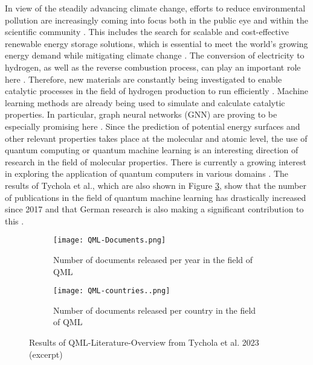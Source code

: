 In view of the steadily advancing climate change, efforts to reduce environmental pollution are
increasingly coming into focus both in the public eye and within the scientific community \cite{amin_hydrogen_2022}.
This includes the search for scalable and cost-effective renewable energy storage solutions, which
is essential to meet the world's growing energy demand while mitigating climate change \cite{kilkis_research_2019}. The
conversion of electricity to hydrogen, as well as the reverse combustion process, can play an
important role here \cite{amin_hydrogen_2022}. Therefore, new materials are constantly being investigated to enable
catalytic processes in the field of hydrogen production to run efficiently \cite{chen_waste-derived_2023}. Machine learning
methods are already being used to simulate and calculate catalytic properties. In particular, graph
neural networks (GNN) are proving to be especially promising here \cite{tran_open_2023, bronstein2017geometric}. Since the prediction of potential energy surfaces and other relevant properties takes place at the molecular and atomic level, the use of quantum computing or quantum machine learning is an interesting direction of research in the field of molecular properties. There is currently a growing interest in exploring the application of quantum computers in various domains \cite{valdez2023review}. The results of Tychola et al., which are also shown in Figure \ref{img:tychola}, show that the number of publications in the field of quantum machine learning has drastically increased since 2017 and that German research is also making a significant contribution to this \cite{Tychola_Kalampokas_Papakostas_2023}.

\begin{figure}[h!]
    \begin{subfigure}{.5\textwidth}
     \captionsetup{justification=centering}
      \centering
      \texttt{[image: QML-Documents.png]}
      \caption{Number of documents released per year in the field of QML}
      \label{fig:sfig1}
    \end{subfigure}%
    \begin{subfigure}{.5\textwidth}
      \centering
      \captionsetup{justification=centering}
      \texttt{[image: QML-countries..png]}
      \caption{Number of documents released per country in the field of QML}
      \label{fig:sfig2}
    \end{subfigure}
    \caption[Results of QML-Literature-Overview from Tychola et al. 2023 (excerpt)]{\label{img:tychola} Results of QML-Literature-Overview from Tychola et al. 2023 \cite{Tychola_Kalampokas_Papakostas_2023} (excerpt)}
    \end{figure}

